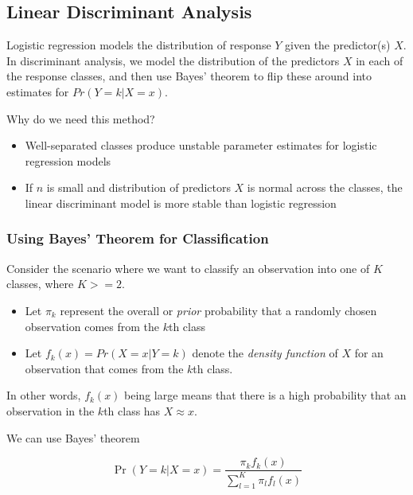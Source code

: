 \documentclass[
]{article}
\providecommand{\tightlist}{%
  \setlength{\itemsep}{0pt}\setlength{\parskip}{0pt}}
\begin{document}
\hypertarget{linear-discriminant-analysis}{%
\subsection{Linear Discriminant
Analysis}\label{linear-discriminant-analysis}}

Logistic regression models the distribution of response \(Y\) given the
predictor(s) \(X\). In discriminant analysis, we model the distribution
of the predictors \(X\) in each of the response classes, and then use
Bayes' theorem to flip these around into estimates for
\(Pr(Y = k|X = x)\).

Why do we need this method?

\begin{itemize}
\item
  Well-separated classes produce unstable parameter estimates for
  logistic regression models
\item
  If \(n\) is small and distribution of predictors \(X\) is normal
  across the classes, the linear discriminant model is more stable than
  logistic regression
\end{itemize}

\hypertarget{using-bayes-theorem-for-classification}{%
\subsubsection{Using Bayes' Theorem for
Classification}\label{using-bayes-theorem-for-classification}}

Consider the scenario where we want to classify an observation into one
of \(K\) classes, where \(K >= 2\).

\begin{itemize}
\tightlist
\item
  Let \(\pi_k\) represent the overall or \emph{prior} probability that a
  randomly chosen observation comes from the \(k\)th class
\item
  Let \(f_k(x) = Pr(X = x|Y = k)\) denote the \emph{density function} of
  \(X\) for an observation that comes from the \(k\)th class.
\end{itemize}

In other words, \(f_k(x)\) being large means that there is a high
probability that an observation in the \(k\)th class has
\(X \approx x\).

We can use Bayes' theorem

\[
\operatorname{Pr}(Y=k | X=x)=\frac{\pi_{k} f_{k}(x)}{\sum_{l=1}^{K} \pi_{l} f_{l}(x)}
\]
\end{document}
